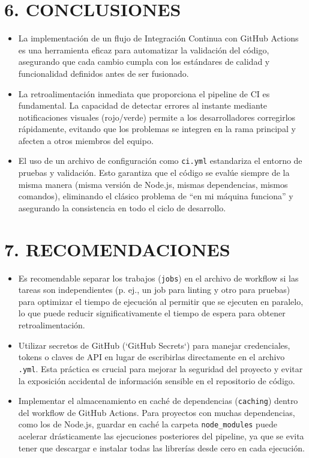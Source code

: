 \documentclass[12pt, a4paper]{article}
\begin{document}
\section*{6. CONCLUSIONES}
\begin{itemize}[leftmargin=*]
    \item La implementaci\'on de un flujo de Integraci\'on Continua con GitHub Actions es una herramienta eficaz para automatizar la validaci\'on del c\'odigo, asegurando que cada cambio cumpla con los est\'andares de calidad y funcionalidad definidos antes de ser fusionado.
    \item La retroalimentaci\'on inmediata que proporciona el pipeline de CI es fundamental. La capacidad de detectar errores al instante mediante notificaciones visuales (rojo/verde) permite a los desarrolladores corregirlos r\'apidamente, evitando que los problemas se integren en la rama principal y afecten a otros miembros del equipo.
    \item El uso de un archivo de configuraci\'on como \texttt{ci.yml} estandariza el entorno de pruebas y validaci\'on. Esto garantiza que el c\'odigo se eval\'ue siempre de la misma manera (misma versi\'on de Node.js, mismas dependencias, mismos comandos), eliminando el cl\'asico problema de ``en mi m\'aquina funciona'' y asegurando la consistencia en todo el ciclo de desarrollo.
\end{itemize}

\section*{7. RECOMENDACIONES}
\begin{itemize}[leftmargin=*]
    \item Es recomendable separar los trabajos (\texttt{jobs}) en el archivo de workflow si las tareas son independientes (p. ej., un job para linting y otro para pruebas) para optimizar el tiempo de ejecuci\'on al permitir que se ejecuten en paralelo, lo que puede reducir significativamente el tiempo de espera para obtener retroalimentaci\'on.
    \item Utilizar secretos de GitHub (`GitHub Secrets`) para manejar credenciales, tokens o claves de API en lugar de escribirlas directamente en el archivo \texttt{.yml}. Esta pr\'actica es crucial para mejorar la seguridad del proyecto y evitar la exposici\'on accidental de informaci\'on sensible en el repositorio de c\'odigo.
    \item Implementar el almacenamiento en cach\'e de dependencias (\texttt{caching}) dentro del workflow de GitHub Actions. Para proyectos con muchas dependencias, como los de Node.js, guardar en cach\'e la carpeta \texttt{node\_modules} puede acelerar dr\'asticamente las ejecuciones posteriores del pipeline, ya que se evita tener que descargar e instalar todas las librer\'ias desde cero en cada ejecuci\'on.
\end{itemize}
\end{document}

